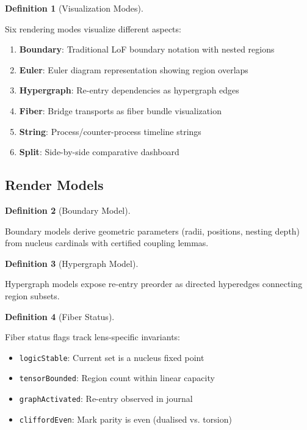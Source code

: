 \documentclass{amsart}
\theoremstyle{definition}
\newtheorem{definition}{Definition}[section]
\theoremstyle{remark}
\begin{document}
\begin{definition}[Visualization Modes]
\label{def:visual-modes}
\uses{}

Six rendering modes visualize different aspects:
\begin{enumerate}
\item \textbf{Boundary}: Traditional LoF boundary notation with nested regions
\item \textbf{Euler}: Euler diagram representation showing region overlaps
\item \textbf{Hypergraph}: Re-entry dependencies as hypergraph edges
\item \textbf{Fiber}: Bridge transports as fiber bundle visualization
\item \textbf{String}: Process/counter-process timeline strings
\item \textbf{Split}: Side-by-side comparative dashboard
\end{enumerate}
\end{definition}

\subsection{Render Models}
\label{sec:render-models}

\begin{definition}[Boundary Model]
\label{def:boundary-model}

Boundary models derive geometric parameters (radii, positions, nesting depth) from nucleus cardinals with certified coupling lemmas.
\end{definition}

\begin{definition}[Hypergraph Model]
\label{def:hypergraph-model}

Hypergraph models expose re-entry preorder as directed hyperedges connecting region subsets.
\end{definition}

\begin{definition}[Fiber Status]
\label{def:fiber-status}

Fiber status flags track lens-specific invariants:
\begin{itemize}
\item \texttt{logicStable}: Current set is a nucleus fixed point
\item \texttt{tensorBounded}: Region count within linear capacity
\item \texttt{graphActivated}: Re-entry observed in journal
\item \texttt{cliffordEven}: Mark parity is even (dualised vs. torsion)
\end{itemize}
\end{definition}
\end{document}
